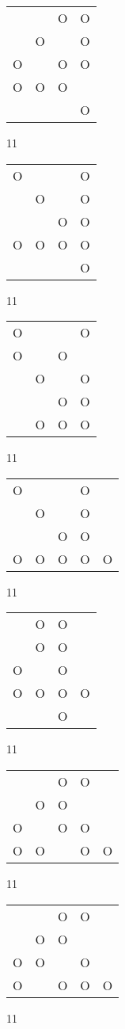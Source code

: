 \begin{tabular}{|m{0.2cm}m{0.2cm}m{0.2cm}m{0.2cm}|}\hline
 & &O&O\\
 &O& &O\\
O& &O&O\\
O&O&O& \\
 & & &O\\
\hline\end{tabular}11
\begin{tabular}{|m{0.2cm}m{0.2cm}m{0.2cm}m{0.2cm}|}\hline
O& & &O\\
 &O& &O\\
 & &O&O\\
O&O&O&O\\
 & & &O\\
\hline\end{tabular}11
\begin{tabular}{|m{0.2cm}m{0.2cm}m{0.2cm}m{0.2cm}|}\hline
O& & &O\\
O& &O& \\
 &O& &O\\
 & &O&O\\
 &O&O&O\\
\hline\end{tabular}11
\begin{tabular}{|m{0.2cm}m{0.2cm}m{0.2cm}m{0.2cm}m{0.2cm}|}\hline
O& & &O& \\
 &O& &O& \\
 & &O&O& \\
O&O&O&O&O\\
\hline\end{tabular}11
\begin{tabular}{|m{0.2cm}m{0.2cm}m{0.2cm}m{0.2cm}|}\hline
 &O&O& \\
 &O&O& \\
O& &O& \\
O&O&O&O\\
 & &O& \\
\hline\end{tabular}11
\begin{tabular}{|m{0.2cm}m{0.2cm}m{0.2cm}m{0.2cm}m{0.2cm}|}\hline
 & &O&O& \\
 &O&O& & \\
O& &O&O& \\
O&O& &O&O\\
\hline\end{tabular}11
\begin{tabular}{|m{0.2cm}m{0.2cm}m{0.2cm}m{0.2cm}m{0.2cm}|}\hline
 & &O&O& \\
 &O&O& & \\
O&O& &O& \\
O& &O&O&O\\
\hline\end{tabular}11
